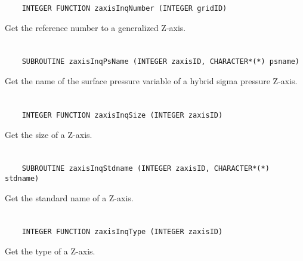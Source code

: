 \begin{verbatim}
    INTEGER FUNCTION zaxisInqNumber (INTEGER gridID)
\end{verbatim}

Get the reference number to a generalized Z-axis.


\section*{\tt {}}

\begin{verbatim}
    SUBROUTINE zaxisInqPsName (INTEGER zaxisID, CHARACTER*(*) psname)
\end{verbatim}

Get the name of the surface pressure variable of a hybrid sigma pressure Z-axis.


\section*{\tt {}}

\begin{verbatim}
    INTEGER FUNCTION zaxisInqSize (INTEGER zaxisID)
\end{verbatim}

Get the size of a Z-axis.


\section*{\tt {}}

\begin{verbatim}
    SUBROUTINE zaxisInqStdname (INTEGER zaxisID, CHARACTER*(*) stdname)
\end{verbatim}

Get the standard name of a Z-axis.


\section*{\tt {}}

\begin{verbatim}
    INTEGER FUNCTION zaxisInqType (INTEGER zaxisID)
\end{verbatim}

Get the type of a Z-axis.


\section*{\tt {}}

